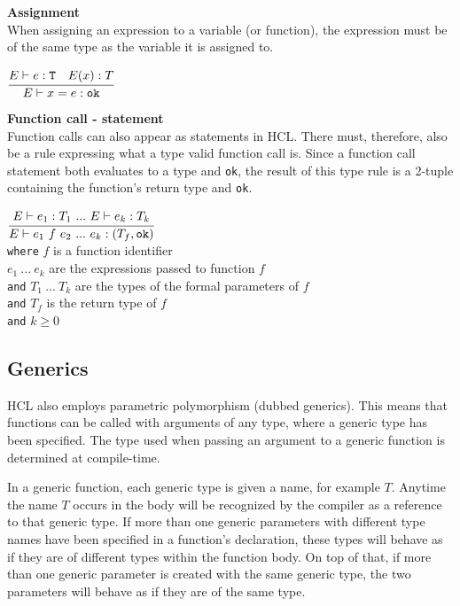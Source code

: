 \textbf{Assignment}\\
When assigning an expression to a variable (or function), the expression must be of the same type as the variable it is assigned to.

\begin{center}
	\begin{math}
	\cfrac
	{E\vdash e : \texttt{T}\quad E(x) : T}
	{E \vdash x = e : \texttt{ok}}
	\end{math}
\end{center}

\textbf{Function call - statement}\\
Function calls can also appear as statements in HCL.
There must, therefore, also be a rule expressing what a type valid function call is.
Since a function call statement both evaluates to a type and \texttt{ok}, the result of this type rule is a 2-tuple containing the function's return type and \texttt{ok}.

\begin{center}
	\begin{math}
	\cfrac
	{E \vdash e_1 : T_1 \ .
		.
		.
		\ E \vdash e_k : T_k}
	{E \vdash e_1\ f\ e_2 \ .
		.
		.
		\ e_k : (T_f, \texttt{ok})}
	\end{math}
	\\[1\baselineskip]
	\texttt{where} $f$ is a function identifier\\
	$e_1\ .
	.
	.
	\ e_k$ are the expressions passed to function $f$\\
	\texttt{and} $T_1\ .
	.
	.
	\ T_k$ are the types of the formal parameters of $f$\\
	\texttt{and} $T_f$ is the return type of $f$\\
	\texttt{and} $k \ge 0$
\end{center}

\subsection{Generics}
HCL also employs parametric polymorphism (dubbed generics).
This means that functions can be called with arguments of any type, where a generic type has been specified.
The type used when passing an argument to a generic function is determined at compile-time.

In a generic function, each generic type is given a name, for example $T$.
Anytime the name $T$ occurs in the body will be recognized by the compiler as a reference to that generic type.
If more than one generic parameters with different type names have been specified in a function's declaration, these types will behave as if they are of different types within the function body.
On top of that, if more than one generic parameter is created with the same generic type, the two parameters will behave as if they are of the same type.

